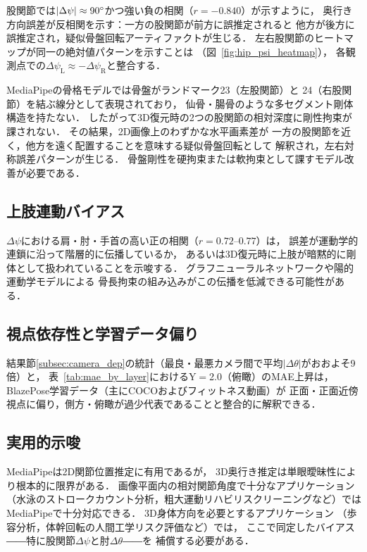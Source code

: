 \documentclass[twocolumn]{article}
\begin{document}
股関節では$|\Delta\psi|\approx90\degree{}$かつ強い負の相関（$r=-0.840$）が示すように，
奥行き方向誤差が反相関を示す：一方の股関節が前方に誤推定されると
他方が後方に誤推定され，疑似骨盤回転アーティファクトが生じる．
左右股関節のヒートマップが同一の絶対値パターンを示すことは
（図~\ref{fig:hip_psi_heatmap}），
各観測点での$\Delta\psi_{\text{L}} \approx -\Delta\psi_{\text{R}}$と整合する．

MediaPipeの骨格モデルでは骨盤がランドマーク23（左股関節）と
24（右股関節）を結ぶ線分として表現されており，
仙骨・腸骨のような多セグメント剛体構造を持たない．
したがって3D復元時の2つの股関節の相対深度に剛性拘束が課されない．
その結果，2D画像上のわずかな水平画素差が
一方の股関節を近く，他方を遠く配置することを意味する疑似骨盤回転として
解釈され，左右対称誤差パターンが生じる．
骨盤剛性を硬拘束または軟拘束として課すモデル改善が必要である．

\subsection{上肢連動バイアス}

$\Delta\psi$における肩・肘・手首の高い正の相関（$r=0.72$--$0.77$）は，
誤差が運動学的連鎖に沿って階層的に伝播しているか，
あるいは3D復元時に上肢が暗黙的に剛体として扱われていることを示唆する．
グラフニューラルネットワークや陽的運動学モデルによる
骨長拘束の組み込みがこの伝播を低減できる可能性がある．

\subsection{視点依存性と学習データ偏り}

結果節\ref{subsec:camera_dep}の統計（最良・最悪カメラ間で平均$|\Delta\theta|$がおおよそ9倍）と，
表~\ref{tab:mae_by_layer}におけるY$=$2.0（俯瞰）のMAE上昇は，
BlazePose学習データ（主にCOCO\cite{coco}およびフィットネス動画\cite{blazepose}）が
正面・正面近傍視点に偏り，側方・俯瞰が過少代表であることと整合的に解釈できる．

\subsection{実用的示唆}

MediaPipeは2D関節位置推定に有用であるが，
3D奥行き推定は単眼曖昧性により根本的に限界がある．
画像平面内の相対関節角度で十分なアプリケーション
（水泳のストロークカウント分析，粗大運動リハビリスクリーニングなど）では
MediaPipeで十分対応できる．
3D身体方向を必要とするアプリケーション
（歩容分析，体幹回転の人間工学リスク評価など）では，
ここで同定したバイアス――特に股関節$\Delta\psi$と肘$\Delta\theta$――を
補償する必要がある．
\end{document}
